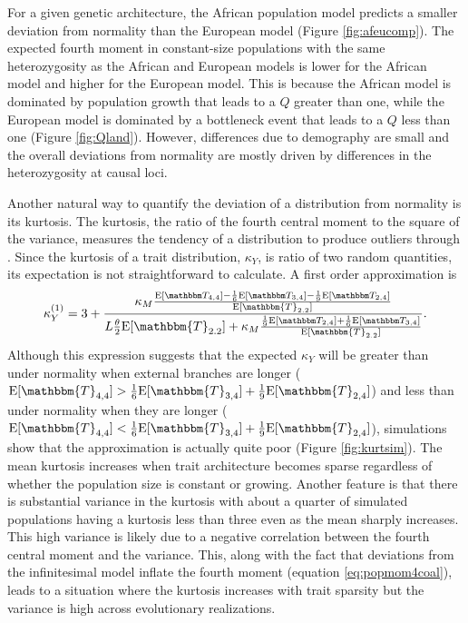 For a given genetic architecture, the African population model predicts a
smaller deviation from normality than the European model
(Figure \ref{fig:afeucomp}). The expected fourth moment in constant-size
populations with the same heterozygosity as the African and European models is
lower for the African model and higher for the European model. This is because
the African model is dominated by population growth that leads to a $Q$ greater
than one, while the European model is dominated by a bottleneck event that leads
to a $Q$ less than one (Figure \ref{fig:Qland}). However, differences due to
demography are small and the overall deviations from normality are mostly driven
by differences in the heterozygosity at causal loci.

Another natural way to quantify the deviation of a distribution from normality
is its kurtosis. The kurtosis, the ratio of the fourth central moment to the
square of the variance, measures the tendency of a distribution to produce
outliers through \citep{Westfall2014}. Since the kurtosis of a trait
distribution, $\kappa_Y$, is ratio of two random quantities, its expectation is
not straightforward to calculate. A first order approximation is
\begin{equation}
    \label{eq:firstord} 
\kappa_Y^{(1)} = 3 + \frac{\kappa_M \frac{\CCC}{\E[\mathbbm{T}_{2.2}]}} {L \T \E[\mathbbm{T}_{2.2}]
    + \kappa_M \frac{\BBB}{\E[\mathbbm{T}_{2.2}]}}.
\end{equation}
Although this expression suggests that the expected $\kappa_Y$ will be greater
than under normality when external branches are longer ($\E[\mathbbm{T}_{4,4}] >
\frac{1}{6}\E[\mathbbm{T}_{3,4}] + \frac{1}{9}\E[\mathbbm{T}_{2,4}]$) and less than under normality
when they are longer ($\E[\mathbbm{T}_{4,4}] < \frac{1}{6}\E[\mathbbm{T}_{3,4}] +
\frac{1}{9}\E[\mathbbm{T}_{2,4}]$), simulations show that the approximation is actually
quite poor (Figure \ref{fig:kurtsim}). The mean kurtosis increases when trait
architecture becomes sparse regardless of whether the population size is
constant or growing. Another feature is that there is substantial variance in
the kurtosis with about a quarter of simulated populations having a kurtosis
less than three even as the mean sharply increases. This high variance is likely
due to a negative correlation between the fourth central moment and the
variance. This, along with the fact that deviations from the infinitesimal model
inflate the fourth moment (equation \eqref{eq:popmom4coal}), leads to a
situation where the kurtosis increases with trait sparsity but the variance is
high across evolutionary realizations.

